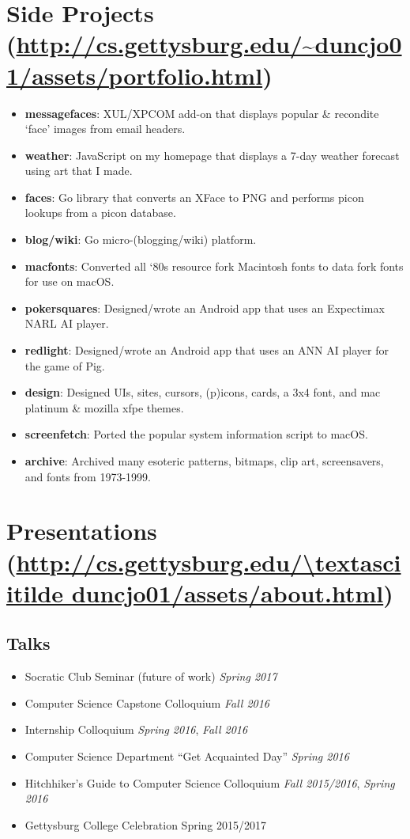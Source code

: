 \documentclass[11pt]{article}
\begin{document}
\section*{Side Projects (\url{http://cs.gettysburg.edu/~duncjo01/assets/portfolio.html})}
\begin{itemize}[noitemsep]
	\item \textbf{messagefaces}: XUL/XPCOM add-on that displays popular \& recondite `face' images from email headers.
	\item \textbf{weather}: JavaScript on my homepage that displays a 7-day weather forecast using art that I made.
	\item \textbf{faces}: Go library that converts an XFace to PNG and performs picon lookups from a picon database.
	\item \textbf{blog/wiki}: Go micro-(blogging/wiki) platform.
	\item \textbf{macfonts}: Converted all `80s resource fork Macintosh fonts to data fork fonts for use on macOS. 
	\item \textbf{pokersquares}: Designed/wrote an Android app that uses an Expectimax NARL AI player. 
	\item \textbf{redlight}: Designed/wrote an Android app that uses an ANN AI player for the game of Pig.
	\item \textbf{design}: Designed UIs, sites, cursors, (p)icons, cards, a 3x4 font, and mac platinum \& mozilla xfpe themes.
	\item \textbf{screenfetch}: Ported the popular system information script to macOS.
	\item \textbf{archive}: Archived many esoteric patterns, bitmaps, clip art, screensavers, and fonts from 1973-1999.
\end{itemize}

\section*{Presentations (\url{http://cs.gettysburg.edu/\textasciitilde duncjo01/assets/about.html})}
\subsection*{Talks}
\begin{itemize}[noitemsep]
	\item Socratic Club Seminar (future of work) \hfill \textit{Spring 2017}
	\item Computer Science Capstone Colloquium \hfill \textit{Fall 2016}
	\item Internship Colloquium \hfill \textit{Spring 2016}, \textit{Fall 2016}
	\item Computer Science Department ``Get Acquainted Day'' \hfill \textit{Spring 2016}
	\item Hitchhiker's Guide to Computer Science Colloquium \hfill \textit{Fall 2015/2016}, \textit{Spring 2016}
	\item Gettysburg College Celebration \hfill Spring 2015/2017
\end{itemize}
\end{document}
